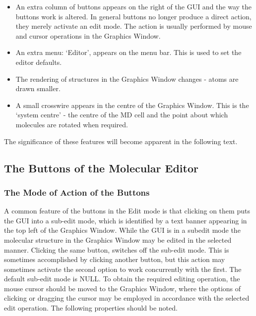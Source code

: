 \begin{itemize}
\item An extra column of buttons appears on the right of the GUI and the way
  the buttons work is altered. In general buttons no longer produce a direct
  action, they merely activate an edit mode. The action is usually performed
  by mouse and cursor operations in the Graphics Window.
\item An extra menu: `Editor', appears on the menu bar. This is used to set
  the editor defaults.  
\item The rendering of structures in the Graphics Window changes - atoms are
  drawn smaller.
\item A small crosswire appears in the centre of the Graphics Window. This is
  the `system centre' - the centre of the MD cell and the point about which
  molecules are rotated when required.
\end{itemize}
The significance of these features will become apparent in the following text.

\subsection{The Buttons of the Molecular Editor}

\subsubsection{The Mode of Action of the Buttons}

A common feature of the buttons in the Edit mode is that clicking on them puts
the GUI into a sub-edit mode, which is identified by a text banner appearing
in the top left of the Graphics Window. While the GUI is in a subedit mode the
molecular structure in the Graphics Window may be edited in the selected
manner. Clicking the same button, switches off the sub-edit mode. This is
sometimes accomplished by clicking another button, but this action may
sometimes activate the second option to work concurrently with the first. The
default sub-edit mode is NULL. To obtain the required editing operation, the
mouse cursor should be moved to the Graphics Window, where the options of
clicking or dragging the cursor may be employed in accordance with the
selected edit operation. The following properties should be noted.

~

